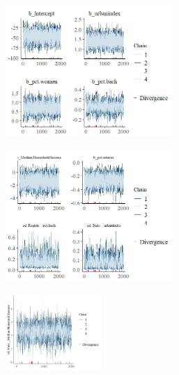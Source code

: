 \documentclass[12pt]{article}
\begin{document}
\begin{figure}
	\centering
	\caption{Trace plots for Model 4, all parameters; 2000 sampling iterations}
	\label{fig:trace_mod4_append}
	\begin{subfigure}{\textwidth}
		\centering
		\includegraphics[width=0.7\textwidth]{trace_plots/trace_model4_part1.jpeg}
	\end{subfigure}
	
	\vspace{0.5em} %
	
	\begin{subfigure}{\textwidth}
		\centering
		\includegraphics[width=0.7\textwidth]{trace_plots/trace_model4_part2}
	\end{subfigure}
	
	\vspace{0.5em} %
	
	\begin{subfigure}{\textwidth}
		\centering
		\includegraphics[width=0.4\textwidth]{trace_plots/trace_model4_part3}
	\end{subfigure}
	
\end{figure}
\end{document}
